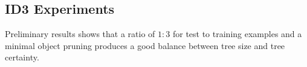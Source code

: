 \subsection{ID3 Experiments}
Preliminary results shows that a ratio of $1:3$ for test to training examples and a minimal object pruning produces a good balance between tree size and tree certainty.
